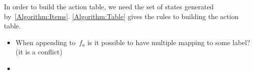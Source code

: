 In order to build the action table, we need the set of states generated
  by~\cref{Algorithm:Items}.
\cref{Algorithm:Table} gives the rules to building the action table.

\begin{algorithm}[h]
  \begin{algorithmic}
    \caption{\label{Algorithm:Table}
      Construction of JLR~$\table ACTION[q,a]$ table}
      \ENDIF
        \ENDFOR
        \ENDFOR
        \ENDIF
      \ENDFOR
    \ENDFOR
  \end{algorithmic}
\end{algorithm}
\begin{itemize}
  \item When appending to~$f_{a}$ is it possible to have multiple mapping to some label? (it is a conflict)
  \item
\end{itemize}

\endinput

\paragraph{Misc.}

